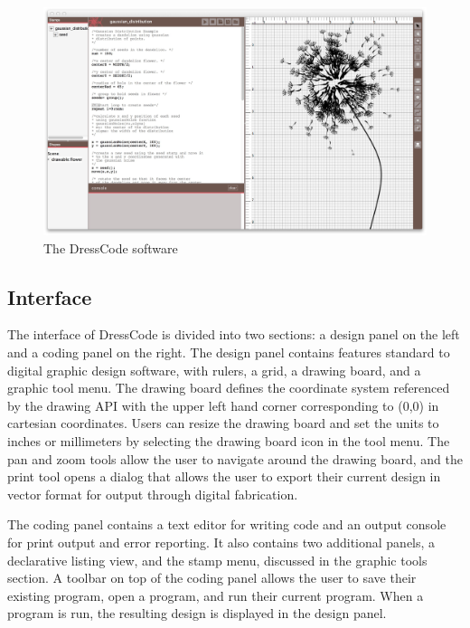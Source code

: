 \documentclass{sigchi}
\begin{document}
\begin{center}
\begin{figure}[h!]
\includegraphics[width=\columnwidth]{images/dresscode_interface.jpg}
\caption{The DressCode software}
\label{fig:dresscode_interface}
\end{figure}
\end{center}
\subsection{Interface}
The interface of DressCode is divided into two sections: a design panel on the left and a coding panel on the right. The design panel contains features standard to digital graphic design software, with rulers, a grid, a drawing board, and a graphic tool menu. The drawing board defines the coordinate system referenced by the drawing API with the upper left hand corner corresponding to (0,0) in cartesian coordinates. Users can resize the drawing board and set the units to inches or millimeters by selecting the drawing board icon in the tool menu. The pan and zoom tools allow the user to navigate around the drawing board, and the print tool opens a dialog that allows the user to export their current design in vector format for output through digital fabrication. 

The coding panel contains a text editor for writing code and an output console for print output and error reporting. It also contains two additional panels, a declarative listing view, and the stamp menu, discussed in the graphic tools section. A toolbar on top of the coding panel allows the user to save their existing program, open a program, and run their current program. When a program is run, the resulting design is displayed in the design panel.
\end{document}
